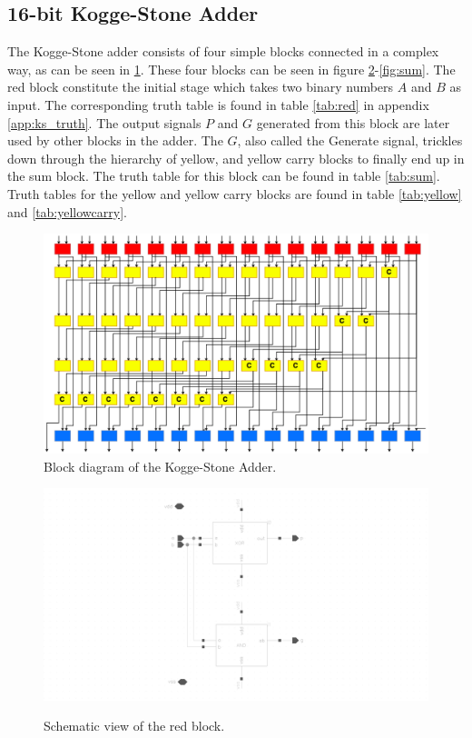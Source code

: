 \subsection{16-bit Kogge-Stone Adder}
The Kogge-Stone adder consists of four simple blocks connected in a complex way, as can be seen in \ref{fig:ks_block}. These four blocks can be seen in figure \ref{fig:red}-\ref{fig:sum}. The red block constitute the initial stage which takes two binary numbers $A$ and $B$ as input. The corresponding truth table is found in table \ref{tab:red} in appendix \ref{app:ks_truth}. The output signals $P$ and $G$ generated from this block are later used by other blocks in the adder. The $G$, also called the Generate signal, trickles down through the hierarchy of yellow, and yellow carry blocks to finally end up in the sum block. The truth table for this block can be found in table \ref{tab:sum}. Truth tables for the yellow and yellow carry blocks are found in table \ref{tab:yellow} and \ref{tab:yellowcarry}.

\begin{figure}[H]
  \centering
  \captionsetup{justification=centering}
  \includegraphics[scale=0.5, angle=90]{../figures/ks_block}
  \caption{Block diagram of the Kogge-Stone Adder.} \label{fig:ks_block}
\end{figure}

\begin{figure}[H]
  \centering
  \captionsetup{justification=centering}
  {\includegraphics[width=2.0\textwidth]{../figures/red}}
  \caption{Schematic view of the red block.} \label{fig:red}
\end{figure}

